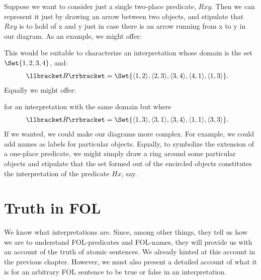 Suppose we want to consider just a single two-place predicate, $Rxy$. Then we can represent it just by drawing an arrow between two objects, and stipulate that $Rxy$ is to hold of x and y just in case there is an arrow running from x to y in our diagram. As an example, we might offer:
\begin{center}
\end{center}
This would be suitable to characterize an interpretation whose domain is the set $\Set{1,2,3,4}$, and:
	\begin{align*}\denote{R}&=\Set{
		\ntuple{1, 2},
		\ntuple{2, 3},
		\ntuple{3, 4},
		\ntuple{4, 1},
		\ntuple{1, 3}}.
	\end{align*}
Equally we might offer:

\begin{center}
\end{center}
for an interpretation with the same domain but where
	\begin{align*}\denote{R}&=\Set{
		\ntuple{1, 3},
		\ntuple{3, 1},
		\ntuple{3, 4},
		\ntuple{1, 1},
		\ntuple{3, 3}}.
	\end{align*}
If we wanted, we could make our diagrams more complex. For example, we could add names as labels for particular objects. Equally, to symbolize the extension of a one-place predicate, we might simply draw a ring around some particular objects and stipulate that the set formed out of the encircled objects constitutes the interpretation of the predicate $Hx$, say.


\chapter{Truth in FOL}\label{s:TruthFOL}
We know what interpretations are. Since, among other things, they tell us how we are to understand FOL-predicates and FOL-names, they will provide us with an account of the truth of atomic sentences. We already hinted at this account in the previous chapter. However, we must also present a detailed account of what it is for an arbitrary FOL sentence to be true or false in an interpretation.

